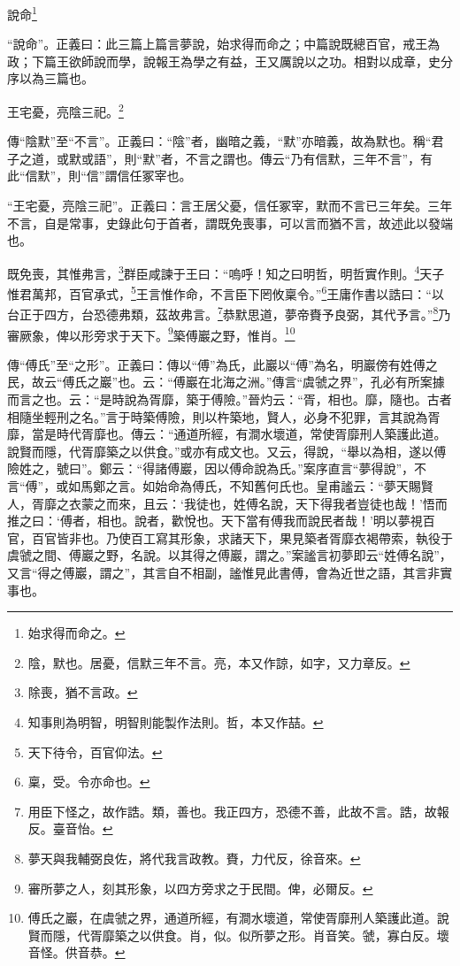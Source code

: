 說命\footnote{始求得而命之。}

{\noindent\shu{}\fzkt “說命”。正義曰：此三篇上篇言夢說，始求得而命之；中篇說既總百官，戒王為政；下篇王欲師說而學，說報王為學之有益，王又厲說以之功。相對以成章，史分序以為三篇也。 \par}

王宅憂，亮陰三祀。\footnote{陰，默也。居憂，信默三年不言。亮，本又作諒，如字，又力章反。}


{\noindent\zhuan{}\fzbyks 傳“陰默”至“不言”。正義曰：“陰”者，幽暗之義，“默”亦暗義，故為默也。稱“君子之道，或默或語”，則“默”者，不言之謂也。傳云“乃有信默，三年不言”，有此“信默”，則“信”謂信任冢宰也。 \par}

{\noindent\shu{}\fzkt “王宅憂，亮陰三祀”。正義曰：言王居父憂，信任冢宰，默而不言已三年矣。三年不言，自是常事，史錄此句于首者，謂既免喪事，可以言而猶不言，故述此以發端也。 \par}

既免喪，其惟弗言，\footnote{除喪，猶不言政。}群臣咸諫于王曰：“嗚呼！知之曰明哲，明哲實作則。\footnote{知事則為明智，明智則能製作法則。哲，本又作喆。}天子惟君萬邦，百官承式，\footnote{天下待令，百官仰法。}王言惟作命，不言臣下罔攸稟令。”\footnote{稟，受。令亦命也。}王庸作書以誥曰：“以台正于四方，台恐德弗類，茲故弗言。\footnote{用臣下怪之，故作誥。類，善也。我正四方，恐德不善，此故不言。誥，故報反。臺音怡。}恭默思道，夢帝賚予良弼，其代予言。”\footnote{夢天與我輔弼良佐，將代我言政教。賚，力代反，徐音來。}乃審厥象，俾以形旁求于天下。\footnote{審所夢之人，刻其形象，以四方旁求之于民間。俾，必爾反。}築傅巖之野，惟肖。\footnote{傅氏之巖，在虞虢之界，通道所經，有澗水壞道，常使胥靡刑人築護此道。說賢而隱，代胥靡築之以供食。肖，似。似所夢之形。肖音笑。虢，寡白反。壞音怪。供音恭。}

{\noindent\zhuan{}\fzbyks 傳“傅氏”至“之形”。正義曰：傳以“傅”為氏，此巖以“傅”為名，明巖傍有姓傅之民，故云“傅氏之巖”也。云：“傅巖在北海之洲。”傳言“虞虢之界”，孔必有所案據而言之也。云：“是時說為胥靡，築于傅險。”晉灼云：“胥，相也。靡，隨也。古者相隨坐輕刑之名。”言于時築傅險，則以杵築地，賢人，必身不犯罪，言其說為胥靡，當是時代胥靡也。傳云：“通道所經，有澗水壞道，常使胥靡刑人築護此道。說賢而隱，代胥靡築之以供食。”或亦有成文也。又云，得說，“舉以為相，遂以傅險姓之，號曰”。鄭云：“得諸傅巖，因以傅命說為氏。”案序直言“夢得說”，不言“傅”，或如馬鄭之言。如始命為傅氏，不知舊何氏也。皇甫謐云：“夢天賜賢人，胥靡之衣蒙之而來，且云：‘我徒也，姓傅名說，天下得我者豈徒也哉！’悟而推之曰：‘傅者，相也。說者，歡悅也。天下當有傅我而說民者哉！’明以夢視百官，百官皆非也。乃使百工寫其形象，求諸天下，果見築者胥靡衣褐帶索，執役于虞虢之間、傅巖之野，名說。以其得之傅巖，謂之。”案謐言初夢即云“姓傅名說”，又言“得之傅巖，謂之”，其言自不相副，謐惟見此書傅，會為近世之語，其言非實事也。 \par}

